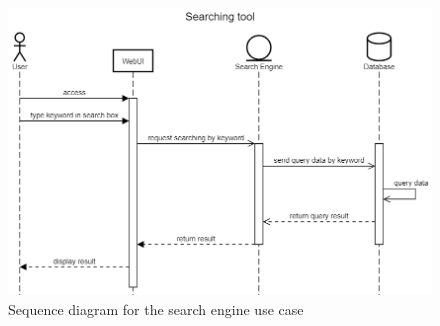 \documentclass[a4paper]{article}
\begin{document}
    \begin{figure}[ht]
        \centering
        \includegraphics[width=1.0\textwidth]{Searching tool.png}
        \caption{Sequence diagram for the search engine use case}
        \label{fig:fig20}
    \end{figure}
\end{document}
